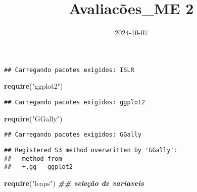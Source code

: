 \documentclass[
]{article}
\title{Avaliacões\_ME 2}
\author{}
\date{\vspace{-2.5em}2024-10-07}
\newenvironment{Shaded}{\begin{snugshade}}{\end{snugshade}}
\newcommand{\AttributeTok}[1]{\textcolor[rgb]{0.13,0.29,0.53}{#1}}
\newcommand{\ConstantTok}[1]{\textcolor[rgb]{0.56,0.35,0.01}{#1}}
\newcommand{\DocumentationTok}[1]{\textcolor[rgb]{0.56,0.35,0.01}{\textbf{\textit{#1}}}}
\newcommand{\FunctionTok}[1]{\textcolor[rgb]{0.13,0.29,0.53}{\textbf{#1}}}
\newcommand{\NormalTok}[1]{#1}
\newcommand{\SpecialCharTok}[1]{\textcolor[rgb]{0.81,0.36,0.00}{\textbf{#1}}}
\newcommand{\StringTok}[1]{\textcolor[rgb]{0.31,0.60,0.02}{#1}}
\begin{document}
\maketitle

{
\setcounter{tocdepth}{2}
\tableofcontents
}
\begin{Shaded}
\end{Shaded}

\begin{verbatim}
## Carregando pacotes exigidos: ISLR
\end{verbatim}

\begin{Shaded}
\begin{Highlighting}[]
\FunctionTok{require}\NormalTok{(}\StringTok{"ggplot2"}\NormalTok{)}
\end{Highlighting}
\end{Shaded}

\begin{verbatim}
## Carregando pacotes exigidos: ggplot2
\end{verbatim}

\begin{Shaded}
\begin{Highlighting}[]
\FunctionTok{require}\NormalTok{(}\StringTok{"GGally"}\NormalTok{)}
\end{Highlighting}
\end{Shaded}

\begin{verbatim}
## Carregando pacotes exigidos: GGally
\end{verbatim}

\begin{verbatim}
## Registered S3 method overwritten by 'GGally':
##   method from   
##   +.gg   ggplot2
\end{verbatim}

\begin{Shaded}
\begin{Highlighting}[]
\FunctionTok{require}\NormalTok{(}\StringTok{"leaps"}\NormalTok{) }\DocumentationTok{\#\# seleção de variaveis}
\end{Highlighting}
\end{Shaded}
\end{document}
